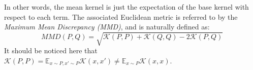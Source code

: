 In other words, the mean kernel is just the expectation of the base kernel with respect to each term. The associated Euclidean metric is referred to by the  \emph{Maximum Mean Discrepancy (MMD)}, and is naturally defined as:
\begin{equation}\label{eq:MMD}
MMD(P,Q) = \sqrt{\mathcal{K}(P,P) + \mathcal{K}(Q,Q) - 2\mathcal{K}(P,Q)}
\end{equation}
It should be noticed here that $\mathcal{K}(P,P) = \mathbb{E}_{x \sim P, x' \sim P} \mathcal{K}(x,x') \neq \mathbb{E}_{x \sim P} \mathcal{K}(x,x)$.


\fi

